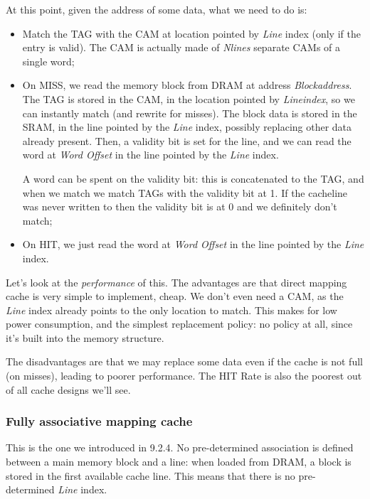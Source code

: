 \documentclass[a4paper,11pt]{article}
\begin{document}
At this point, given the address of some data, what we need to do is:
\begin{itemize}
	\item Match the TAG with the CAM at location pointed by \textit{Line} index (only if the entry is valid).
	      The CAM is actually made of \textit{Nlines} separate CAMs of a single word;
	\item
	      On MISS, we read the memory block from DRAM at address \textit{Blockaddress}.
	      The TAG is stored in the CAM, in the location pointed by \textit{Lineindex}, so we can instantly match (and rewrite for misses). The block data is stored in the SRAM, in the line pointed by the \textit{Line} index, possibly replacing other data already present.
	      Then, a validity bit is set for the line, and we can read the word at \textit{Word Offset} in the line pointed by the \textit{Line} index.

	      A word can be spent on the validity bit: this is concatenated to the TAG, and when we match we match TAGs with the validity bit at 1. If the cacheline was never written to then the validity bit is at 0 and we definitely don't match;
	\item
	      On HIT, we just read the word at \textit{Word Offset} in the line pointed by the \textit{Line} index.
\end{itemize}

Let's look at the \textit{performance} of this.
The advantages are that direct mapping cache is very simple to implement, cheap.
We don’t even need a CAM, as the \textit{Line} index already points to the only location to match.
This makes for low power consumption, and the simplest replacement policy: no policy at all, since it's built into the memory structure.

The disadvantages are that we may replace some data even if the cache is not full (on misses), leading to poorer performance. The HIT Rate is also the poorest out of all cache designs we'll see.

\subsubsection{Fully associative mapping cache}

This is the one we introduced in 9.2.4.
No pre-determined association is defined between a main memory block and a line: when loaded from DRAM, a block is stored in the first available cache line.
This means that there is no pre-determined \textit{Line} index.
\end{document}
